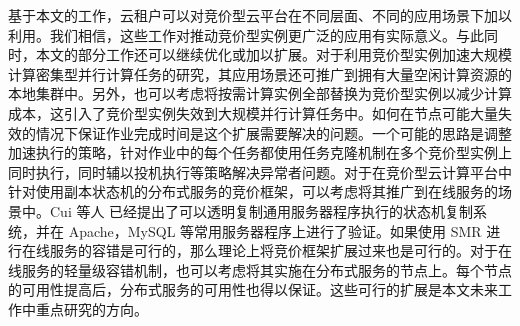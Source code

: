 基于本文的工作，云租户可以对竞价型云平台在不同层面、不同的应用场景下加以利用。我们相信，这些工作对推动竞价型实例更广泛的应用有实际意义。与此同时，本文的部分工作还可以继续优化或加以扩展。对于利用竞价型实例加速大规模计算密集型并行计算任务的研究，其应用场景还可推广到拥有大量空闲计算资源的本地集群中。另外，也可以考虑将按需计算实例全部替换为竞价型实例以减少计算成本，这引入了竞价型实例失效到大规模并行计算任务中。如何在节点可能大量失效的情况下保证作业完成时间是这个扩展需要解决的问题。一个可能的思路是调整加速执行的策略，针对作业中的每个任务都使用任务克隆机制在多个竞价型实例上同时执行，同时辅以投机执行等策略解决异常者问题。对于在竞价型云计算平台中针对使用副本状态机的分布式服务的竞价框架，可以考虑将其推广到在线服务的场景中。Cui 等人 \cite{Cui:2015:PAM:2815400.2815427} 已经提出了可以透明复制通用服务器程序执行的状态机复制系统，并在 Apache，MySQL 等常用服务器程序上进行了验证。如果使用 SMR 进行在线服务的容错是可行的，那么理论上将竞价框架扩展过来也是可行的。对于在线服务的轻量级容错机制，也可以考虑将其实施在分布式服务的节点上。每个节点的可用性提高后，分布式服务的可用性也得以保证。这些可行的扩展是本文未来工作中重点研究的方向。